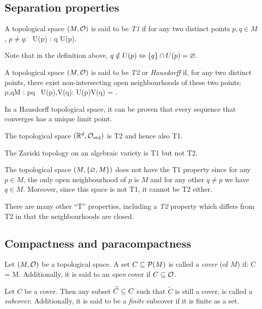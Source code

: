 \subsection{Separation properties}

\bd
A topological space $(M,\mathcal{O})$ is said to be \emph{T1} if for any two distinct points $p,q\in M$, $p\neq q$:
\bse
\exists \, U(p) \in \cO : q \notin U(p).
\ese
\ed

Note that in the definition above, $q \notin U(p) \Leftrightarrow \{q\} \cap U(p) = \varnothing.$

\bd
A topological space $(M,\mathcal{O})$ is said to be \emph{T2} or \emph{Hausdorff} if, for any two distinct points, there exist non-intersecting open neighbourhoods of these two points:
\bse
\forall \, p,q\in M : p\neq q \imp \exists \, U(p),V(q)\in \cO : U(p)\cap V(q) = \vn.
\ese
\ed

\br
In a Hausdorff topological space, it can be proven that every sequence that
converges has a unique limit point.
\er

\be
The topological space $(\mathbb{R}^d,\mathcal{O}_\mathrm{std})$ is T2 and hence also T1.
\ee

\be
The Zariski topology on an algebraic variety is T1 but not T2.
\ee

\be
The topological space $(M,\{\varnothing,M\})$ does not have the T1 property since for any $p \in M$, the only open neighbourhood of $p$ is $M$ and for any other $q\neq p$ we have $q\in M$. Moreover, since this space is not T1, it cannot be T2 either.
\ee

\br
There are many other ``T'' properties, including a \emph{T2} property which differs from T2 in that the neighbourhoods are closed.
\er

\subsection{Compactness and paracompactness}

\bd
Let $(M,\mathcal{O})$ be a topological space. A set $C \subseteq \mathcal{P}(M)$ is called a \emph{cover} (of $M$) if:
\bse
\bigcup C = M.
\ese
Additionally, it is said to an \emph{open} cover if $C \subseteq \mathcal{O}$.
\ed

\bd
Let $C$ be a cover. Then any subset $\widetilde{C}\subseteq C$ such that $\widetilde{C}$ is still a cover, is called a \emph{subcover}. Additionally, it is said to be a \emph{finite} subcover if it is finite as a set.
\ed

